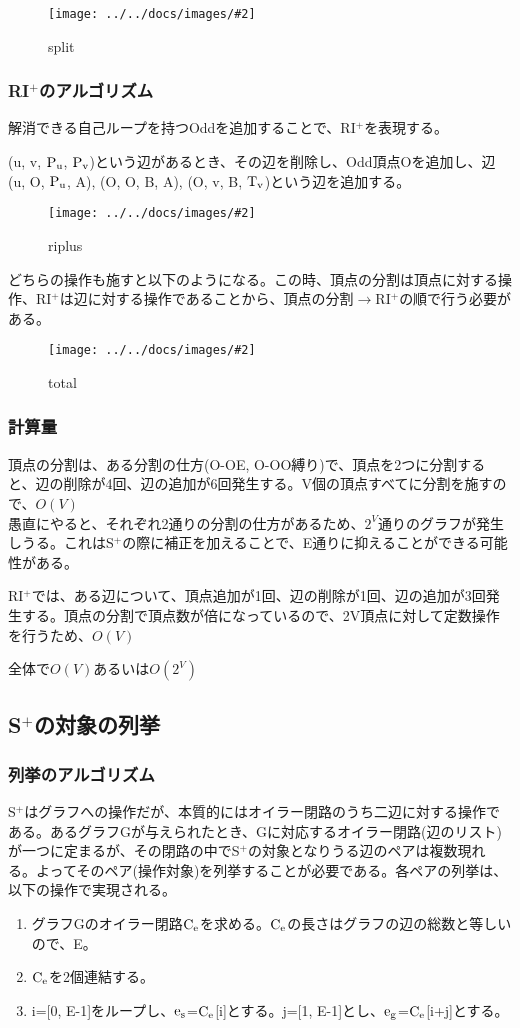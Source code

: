 \documentclass[11pt,a4j]{jarticle}
\newcommand{\splus}{S${}^\text{+}$}
\newcommand{\riplus}{RI${}^\text{+}$}
\newcommand{\f}[1]{$\rm{#1}$} %
\newcommand{\image}[4][height=100pt]{%
\begin{figure}[htbp]
    \centering
    \texttt{[image: ../../docs/images/\#2]}
    \caption{#3}
    \label{fig:#4}
\end{figure}%
}
\newcommand{\ra }{$\rightarrow$}
\begin{document}
\image{extend_split.jpg}{split}{split}

\subsubsection{\riplus のアルゴリズム}
解消できる自己ループを持つOddを追加することで、\riplus を表現する。

(u, v, \f{P_u}, \f{P_v})という辺があるとき、その辺を削除し、Odd頂点Oを追加し、辺(u, O, \f{P_u}, A), (O, O, B, A), (O, v, B, \f{T_v})という辺を追加する。

\image{extend_riplus.jpg}{riplus}{riplus}

どちらの操作も施すと以下のようになる。この時、頂点の分割は頂点に対する操作、\riplus は辺に対する操作であることから、頂点の分割\ra \riplus の順で行う必要がある。
\image{extend_total.jpg}{total}{total}

\subsubsection{計算量}
頂点の分割は、ある分割の仕方(O-OE, O-OO縛り)で、頂点を2つに分割すると、辺の削除が4回、辺の追加が6回発生する。V個の頂点すべてに分割を施すので、$O(V)$\\
愚直にやると、それぞれ2通りの分割の仕方があるため、$2^V$通りのグラフが発生しうる。これは\splus の際に補正を加えることで、E通りに抑えることができる可能性がある。

\riplus では、ある辺について、頂点追加が1回、辺の削除が1回、辺の追加が3回発生する。頂点の分割で頂点数が倍になっているので、2V頂点に対して定数操作を行うため、$O(V)$

全体で$O(V)$あるいは$O(2^V)$

\subsection{\splus の対象の列挙}
\label{enum}
\subsubsection{列挙のアルゴリズム}
\splus はグラフへの操作だが、本質的にはオイラー閉路のうち二辺に対する操作である。あるグラフGが与えられたとき、Gに対応するオイラー閉路(辺のリスト)が一つに定まるが、その閉路の中で\splus の対象となりうる辺のペアは複数現れる。よってそのペア(操作対象)を列挙することが必要である。各ペアの列挙は、以下の操作で実現される。

\begin{enumerate}
    \item グラフGのオイラー閉路\f{C_e}を求める。\f{C_e}の長さはグラフの辺の総数と等しいので、E。
    \item \f{C_e}を2個連結する。
    \item i=[0, E-1]をループし、\f{e_s}=\f{C_e}[i]とする。j=[1, E-1]とし、\f{e_g}=\f{C_e}[i+j]とする。
\end{enumerate}
\end{document}
